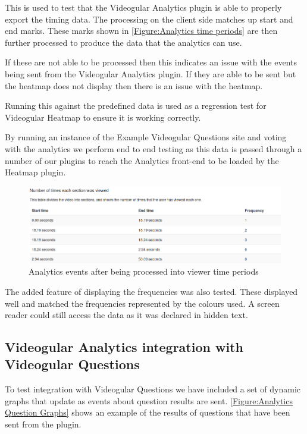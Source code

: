 This is used to test that the Videogular Analytics plugin is able to properly export the timing data. The processing on the client side matches up start and end marks. These marks shown in \autoref{Figure:Analytics time periods} are then further processed to produce the data that the analytics can use.

If these are not able to be processed then this indicates an issue with the events being sent from the Videogular Analytics plugin. If they are able to be sent but the heatmap does not display then there is an issue with the heatmap.

Running this against the predefined data is used as a regression test for Videogular Heatmap to ensure it is working correctly.

By running an instance of the Example Videogular Questions site and voting with the analytics we perform end to end testing as this data is passed through a number of our plugins to reach the Analytics front-end to be loaded by the Heatmap plugin.

\begin{figure}[h]
	\centering
		\includegraphics[scale=0.4]{../figures/analytics_time_periods.png}
	\caption{\label{Figure:Analytics time periods} Analytics events after being processed into viewer time periods}
\end{figure}

The added feature of displaying the frequencies was also tested. These displayed well and matched the frequencies represented by the colours used. A screen reader could still access the data as it was declared in hidden text.

\subsection{Videogular Analytics integration with Videogular Questions}

To test integration with Videogular Questions we have included a set of dynamic graphs that update as events about question results are sent. \autoref{Figure:Analytics Question Graphs} shows an example of the results of questions that have been sent from the plugin.


